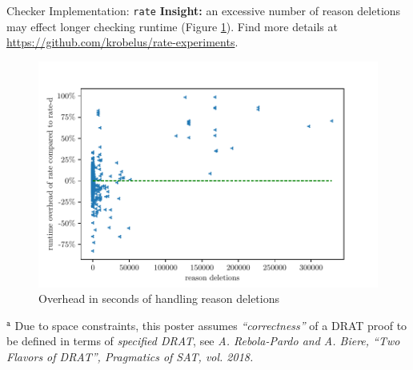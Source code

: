 \documentclass[final,hyperref={pdfpagelabels=true}]{beamer}
\begin{document}
\begin{frame}[fragile]
\begin{columns}[t]
\begin{column}{.45\textwidth}
\begin{block}{Checker Implementation: \texttt{rate}}
    \textbf{Insight:} an excessive number of reason
    deletions may effect longer checking runtime (Figure
    \ref{fig:correlation-reason-deletions-time-delta}).  Find more details
    at \url{https://github.com/krobelus/rate-experiments}.

    \vspace{.5cm}

    \begin{figure}
        \centering
        \caption{Overhead in seconds of handling reason deletions\label{fig:correlation-reason-deletions-time-delta}}
        \includegraphics[scale=2]{../p/correlation-reason-deletions-time-delta-percent.pdf}
    \end{figure}

    \begin{singlespace}
        \footnotesize
        $^\texttt{a}$ Due to space constraints, this poster assumes
        \emph{``correctness''} of a DRAT proof to be defined in terms of
        \emph{specified DRAT}, see \emph{A. Rebola-Pardo and A. Biere, ``Two
        Flavors of DRAT'', Pragmatics of SAT, vol. 2018.}
    \end{singlespace}

    \end{block}
    \end{column}
  \end{columns}
\end{frame}
\end{document}
